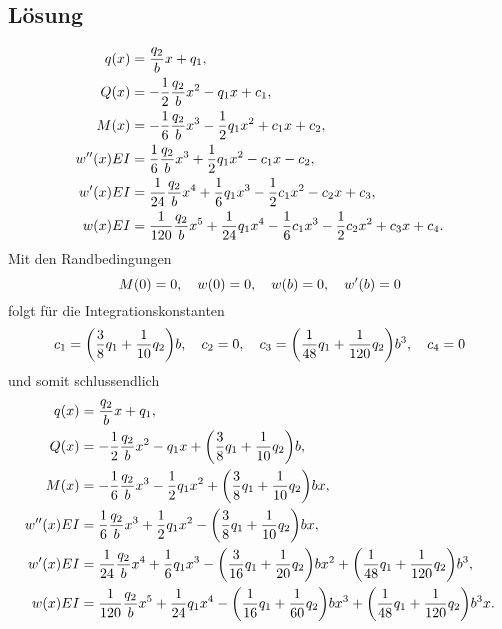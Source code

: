\documentclass{exercise}
\begin{document}
    \subsection*{Lösung}
    \begin{align*}
        q\parentheses*{x} &= \frac{q_2}{b}x + q_1,\\
        Q\parentheses*{x} &= -\frac{1}{2}\frac{q_2}{b}x^2 - q_1 x + c_1,\\
        M\parentheses*{x} &= -\frac{1}{6}\frac{q_2}{b}x^3 - \frac{1}{2}q_1 x^2 + c_1 x + c_2,\\
        w''\parentheses*{x}EI &= \frac{1}{6}\frac{q_2}{b}x^3 + \frac{1}{2}q_1 x^2 - c_1 x - c_2,\\
        w'\parentheses*{x}EI &= \frac{1}{24}\frac{q_2}{b}x^4 + \frac{1}{6}q_1 x^3 - \frac{1}{2}c_1 x^2 - c_2 x + c_3,\\
        w\parentheses*{x}EI &= \frac{1}{120}\frac{q_2}{b}x^5 + \frac{1}{24}q_1 x^4 - \frac{1}{6}c_1 x^3 - \frac{1}{2}c_2 x^2 + c_3 x + c_4.
    \end{align*}
    Mit den Randbedingungen
    \[
        M\parentheses*{0} = 0, \quad w\parentheses*{0} = 0, \quad w\parentheses*{b} = 0, \quad w'\parentheses*{b} = 0
    \]
    folgt für die Integrationskonstanten
    \[
        c_1 = \parentheses*{\frac{3}{8}q_1 + \frac{1}{10}q_2}b, \quad c_2 = 0, \quad c_3 = \parentheses*{\frac{1}{48}q_1 + \frac{1}{120}q_2}b^3, \quad c_4 = 0
    \]
    und somit schlussendlich
    \begin{align*}
        q\parentheses*{x} &= \frac{q_2}{b}x + q_1,\\
        Q\parentheses*{x} &= -\frac{1}{2}\frac{q_2}{b}x^2 - q_1 x + \parentheses*{\frac{3}{8}q_1 + \frac{1}{10}q_2}b,\\
        M\parentheses*{x} &= -\frac{1}{6}\frac{q_2}{b}x^3 - \frac{1}{2}q_1 x^2 + \parentheses*{\frac{3}{8}q_1 + \frac{1}{10}q_2}bx,\\
        w''\parentheses*{x}EI &= \frac{1}{6}\frac{q_2}{b}x^3 + \frac{1}{2}q_1 x^2 - \parentheses*{\frac{3}{8}q_1 + \frac{1}{10}q_2}bx,\\
        w'\parentheses*{x}EI &= \frac{1}{24}\frac{q_2}{b}x^4 + \frac{1}{6}q_1 x^3 - \parentheses*{\frac{3}{16}q_1 + \frac{1}{20}q_2}bx^2 + \parentheses*{\frac{1}{48}q_1 + \frac{1}{120}q_2}b^3,\\
        w\parentheses*{x}EI &= \frac{1}{120}\frac{q_2}{b}x^5 + \frac{1}{24}q_1 x^4 - \parentheses*{\frac{1}{16}q_1 + \frac{1}{60}q_2}bx^3 + \parentheses*{\frac{1}{48}q_1 + \frac{1}{120}q_2}b^3x.
    \end{align*}
\end{document}
